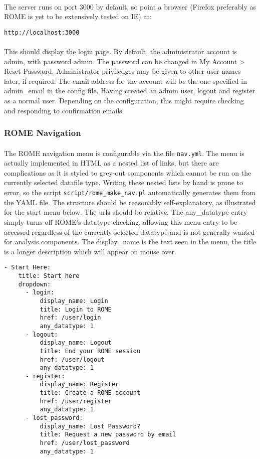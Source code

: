 \paragraph{}
The server runs on port 3000 by default, so point a browser (Firefox preferably as ROME is yet to be extensively tested on IE) at:

\begin{verbatim}
http://localhost:3000
\end{verbatim}

\paragraph{}
This should display the login page.  By default, the administrator account is admin, with password admin. The password can be changed in My Account > Reset Password. Administrator priviledges may be given to other user names later, if required. The email address for the account will be the one specified in admin\_email in the config file. Having created an admin user, logout and register as a normal user. Depending on the configuration, this might require checking and responding to confirmation emails.



\subsubsection{ROME Navigation}
\paragraph{}
The ROME navigation menu is configurable via the file \texttt{nav.yml}. The menu is actually implemented in HTML as a nested list of links, but there are complications as it is styled to grey-out components which cannot be run on the currently selected datafile type. Writing these nested lists by hand is prone to error, so the script \texttt{script/rome\_make\_nav.pl} automatically generates them from the YAML file. The structure should be reasonably self-explanatory, as illustrated for the start menu below. The urls should be relative. The any\_datatype entry simply turns off ROME's datatype checking, allowing this menu entry to be accessed regardless of the currently selected datatype and is not generally wanted for analysis components. The display\_name is the text seen in the menu, the title is a longer description which will appear on mouse over.

\begin{verbatim}
- Start Here:
    title: Start here
    dropdown:
      - login:
          display_name: Login
          title: Login to ROME
          href: /user/login
          any_datatype: 1
      - logout:
          display_name: Logout
          title: End your ROME session
          href: /user/logout
          any_datatype: 1
      - register:
          display_name: Register
          title: Create a ROME account
          href: /user/register
          any_datatype: 1
      - lost_password:
          display_name: Lost Password?
          title: Request a new password by email
          href: /user/lost_password
          any_datatype: 1
\end{verbatim}




